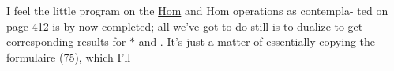 I feel the little program on the \uline{Hom} and Hom  operations\hand{,} as contempla-%
ted on page 412\hand{,} is by now completed;  all we've got to do still is to
dualize  to get corresponding  results for $\ast$ and \hand{$\circledast$}.  It's
just a matter of essentially copying the formulaire (75),  which I'll 

